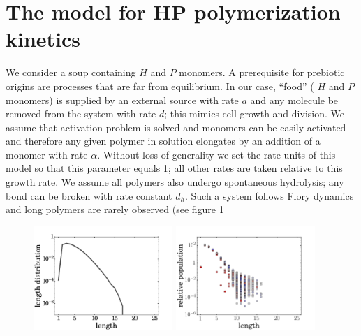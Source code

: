 \documentclass[journal=jacsat,manuscript=article,layout=twocolumn]{achemso}
\newcommand*{\ga}{\alpha}
\begin{document}
\section{The model for HP polymerization kinetics}

 We consider a soup containing $H$ and $P$ monomers. 
 A prerequisite for prebiotic origins are processes that are far from equilibrium.  In our case, 
``food'' ( $H$  and $P$ monomers) is supplied by an external source with rate $a$ and any molecule 
be removed from the system with rate $d$; this 
mimics cell growth and division. We assume that activation problem is solved and monomers can be 
easily activated and therefore any given polymer in solution elongates by an addition of a monomer 
with rate $\ga$.  
Without loss of generality we set the rate units of this model so that this parameter 
equals 1; all other rates are taken relative to this growth rate.  We assume all polymers also 
undergo spontaneous hydrolysis; any bond can be broken with rate constant $d_h$. Such a system 
follows Flory dynamics and long polymers are rarely observed (see figure \ref{fig:sim_pure_flory}
\begin{figure}[ht!]
  \centering
  \includegraphics[width=0.47\textwidth]{pictures/floryDistrOnly16.pdf} 
  \includegraphics[width=0.47\textwidth]{pictures/m019-d01dh01-scatter-hp.png} 
  \caption{}
  \label{fig:sim_pure_flory}
\end{figure}
\end{document}
